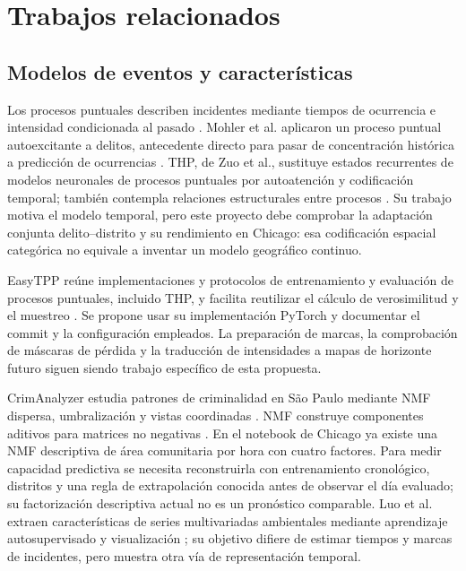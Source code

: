 \documentclass[10pt,a4paper,twocolumn]{article}
\begin{document}
\section{Trabajos relacionados}
\subsection{Modelos de eventos y características}
Los procesos puntuales describen incidentes mediante tiempos de ocurrencia e intensidad condicionada al pasado \cite{rasmussen2018notes}. Mohler et al. aplicaron un proceso puntual autoexcitante a delitos, antecedente directo para pasar de concentración histórica a predicción de ocurrencias \cite{mohler2011crime}. THP, de Zuo et al., sustituye estados recurrentes de modelos neuronales de procesos puntuales por autoatención y codificación temporal; también contempla relaciones estructurales entre procesos \cite{zuo2020thp}. Su trabajo motiva el modelo temporal, pero este proyecto debe comprobar la adaptación conjunta delito--distrito y su rendimiento en Chicago: esa codificación espacial categórica no equivale a inventar un modelo geográfico continuo.

EasyTPP reúne implementaciones y protocolos de entrenamiento y evaluación de procesos puntuales, incluido THP, y facilita reutilizar el cálculo de verosimilitud y el muestreo \cite{xue2024easytpp}. Se propone usar su implementación PyTorch y documentar el commit y la configuración empleados. La preparación de marcas, la comprobación de máscaras de pérdida y la traducción de intensidades a mapas de horizonte futuro siguen siendo trabajo específico de esta propuesta.

CrimAnalyzer estudia patrones de criminalidad en São Paulo mediante NMF dispersa, umbralización y vistas coordinadas \cite{garcia2021crimanalyzer}. NMF construye componentes aditivos para matrices no negativas \cite{lee1999nmf}. En el notebook de Chicago ya existe una NMF descriptiva de área comunitaria por hora con cuatro factores. Para medir capacidad predictiva se necesita reconstruirla con entrenamiento cronológico, distritos y una regla de extrapolación conocida antes de observar el día evaluado; su factorización descriptiva actual no es un pronóstico comparable. Luo et al. extraen características de series multivariadas ambientales mediante aprendizaje autosupervisado y visualización \cite{luo2024airquality}; su objetivo difiere de estimar tiempos y marcas de incidentes, pero muestra otra vía de representación temporal.
\end{document}
